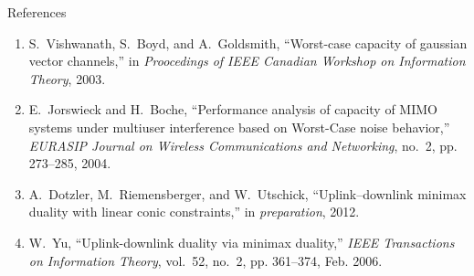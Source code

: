 \documentclass[a0,2col,print,fontscale=1.3]{msvposter}
\begin{document}
\begin{poster}
\begin{postercolumn}
\begin{posterbox}{References}
\tiny{
\begin{enumerate}
\item
S.~Vishwanath, S.~Boyd, and A.~Goldsmith, ``Worst-case capacity of gaussian
  vector channels,'' in \emph{Proocedings of {IEEE} Canadian Workshop on
  Information Theory}, 2003.
\item
E.~Jorswieck and H.~Boche, ``Performance analysis of capacity of {MIMO} systems
  under multiuser interference based on {Worst-Case} noise behavior,''
  \emph{{EURASIP} Journal on Wireless Communications and Networking}, no.~2,
  pp. 273--285, 2004.
\item
A.~Dotzler, M.~Riemensberger, and W.~Utschick, ``Uplink--downlink minimax
  duality with linear conic constraints,'' in \emph{preparation}, 2012.
\item
W.~Yu, ``Uplink-downlink duality via minimax duality,'' \emph{{IEEE}
  Transactions on Information Theory}, vol.~52, no.~2, pp. 361--374, Feb. 2006.
\end{enumerate}
}

\end{posterbox}

\end{postercolumn}

\end{poster}
    
\end{document}

